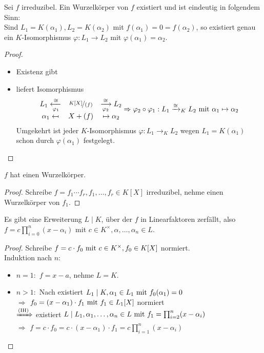\begin{proposition}
	Sei $f$ irreduzibel. Ein Wurzelkörper von $f$ existiert und ist eindeutig in folgendem Sinn:\\
	Sind $L_1 = K(\alpha_1), L_2 = K(\alpha_2)$ mit $f(\alpha_1) = 0 = f(\alpha_2)$, so existiert genau ein $K$-Isomorphismus $\varphi: L_1 \to L_2$ mit $\varphi(\alpha_1) = \alpha_2$.
\end{proposition}
\begin{proof}
	\begin{itemize}
		\item Existenz gibt 
		\item {} liefert Isomorphismus
		\begin{align*}
			\begin{matrix}
				L_1 \xleftarrow[\varphi_1]{\cong} & \lnkset{K[X]}{(f)} & \xrightarrow[\varphi_2]{\cong} L_2\\
				\alpha_1 \mapsfrom & X + (f) & \mapsto \alpha_2\\
			\end{matrix}
			\Rightarrow \varphi_2 \circ \varphi_1 : L_1 \xrightarrow{\cong}_K L_2 \mit \alpha_1 \mapsto \alpha_2
		\end{align*}
		Umgekehrt ist jeder $K$-Isomorphismus $\varphi: L_1 \to_K L_2$ wegen $L_1 = K(\alpha_1)$ schon durch $\varphi(\alpha_1)$ festgelegt.
	\end{itemize}
\end{proof}
\begin{conclusion}
	$f$ hat einen Wurzelkörper.
\end{conclusion}
\begin{proof}
	Schreibe $f=f_1\cdots f_r, f_1,\dots,f_r \in K[X]$ irreduzibel, nehme einen Wurzelkörper von $f_1$.
\end{proof}
\begin{conclusion}
	Es gibt eine Erweiterung $L\mid K$, über der $f$ in Linearfaktoren zerfällt, also $f=c\prod_{i=0}^{n}(x-\alpha_i)$ mit $c \in K^{\times}, \alpha,\dots,\alpha_n \in L$. 
\end{conclusion}
\begin{proof}
	Schreibe $f=c\cdot f_0 \mit c \in K^{\times}, f_0 \in K[X]$ normiert.\\ Induktion nach $n$:
	\begin{itemize}
		\item $n=1:$ $f = x-a$, nehme $L=K$.
		\item $n>1:$ Nach  existiert $L_1 \mid K, \alpha_1 \in L_1 \mit f_0 (\alpha_1) = 0$\\
		$\Rightarrow$ $f_0 = (x-\alpha_1)\cdot f_1 \mit f_1 \in L_1 [X]$ normiert\\
		$\xRightarrow{\text{(IH)}}$ existiert $L\mid L_1 , \alpha_1, \dots, \alpha_n \in L \mit f_1 = \prod_{i=2}^n (x - \alpha_i)$\\
		$\Rightarrow$ $f = c\cdot f_0 = c\cdot (x-\alpha_1) \cdot f_1 = c \prod_{i=1}^n (x- \alpha_i)$
	\end{itemize}
\end{proof}
